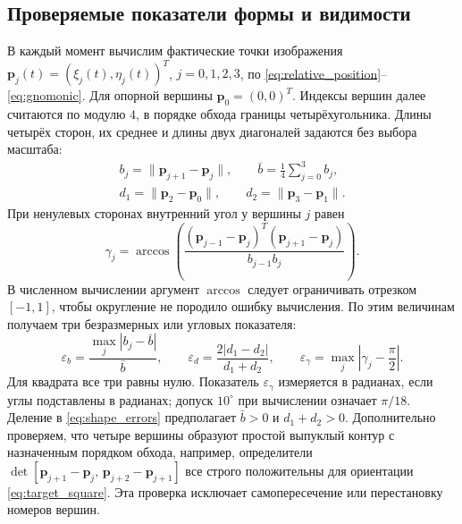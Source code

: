 \documentclass[a4paper,12pt]{article}
\begin{document}
\subsection{Проверяемые показатели формы и видимости}
\label{sec:shape_criteria}

В каждый момент вычислим фактические точки изображения
$\mathbf p_j(t)=(\xi_j(t),\eta_j(t))^T$, $j=0,1,2,3$, по
\eqref{eq:relative_position}--\eqref{eq:gnomonic}. Для опорной вершины
$\mathbf p_0=(0,0)^T$. Индексы вершин далее считаются по модулю $4$,
в порядке обхода границы четырёхугольника. Длины четырёх сторон,
их среднее и длины двух диагоналей задаются без выбора масштаба:
\begin{equation}
\begin{gathered}
 b_j=\|\mathbf p_{j+1}-\mathbf p_j\|,\qquad
 \bar b=\frac14\sum_{j=0}^{3}b_j,\\
 d_1=\|\mathbf p_2-\mathbf p_0\|,\qquad
 d_2=\|\mathbf p_3-\mathbf p_1\|.
\end{gathered}
\label{eq:side_diagonal_definitions}
\end{equation}
При ненулевых сторонах внутренний угол у вершины $j$ равен
\begin{equation}
 \gamma_j=\arccos\!\left(
 \frac{(\mathbf p_{j-1}-\mathbf p_j)^T
       (\mathbf p_{j+1}-\mathbf p_j)}
      {b_{j-1}b_j}\right).
 \label{eq:interior_angles}
\end{equation}
В численном вычислении аргумент $\arccos$ следует ограничивать
отрезком $[-1,1]$, чтобы округление не породило ошибку вычисления.
По этим величинам получаем три безразмерных или угловых показателя:
\begin{equation}
 \varepsilon_b=\frac{\max_j|b_j-\bar b|}{\bar b},\qquad
 \varepsilon_d=\frac{2|d_1-d_2|}{d_1+d_2},\qquad
 \varepsilon_\gamma=\max_j\left|\gamma_j-\frac{\pi}{2}\right|.
 \label{eq:shape_errors}
\end{equation}
Для квадрата все три равны нулю. Показатель
$\varepsilon_\gamma$ измеряется в радианах, если углы подставлены
в радианах; допуск $10^\circ$ при вычислении означает $\pi/18$.
Деление в \eqref{eq:shape_errors} предполагает $\bar b>0$ и
$d_1+d_2>0$. Дополнительно проверяем, что четыре вершины
образуют простой выпуклый контур с назначенным порядком обхода,
например, определители
$\det[\mathbf p_{j+1}-\mathbf p_j,\,
       \mathbf p_{j+2}-\mathbf p_{j+1}]$
все строго положительны для ориентации
\eqref{eq:target_square}. Эта проверка исключает самопересечение
или перестановку номеров вершин.
\end{document}
